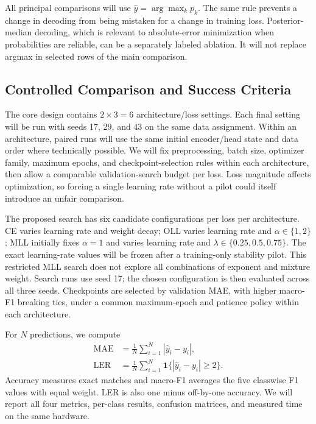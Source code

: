 \documentclass[conference]{IEEEtran}
\newcommand{\MAE}{\operatorname{MAE}}
\newcommand{\LER}{\operatorname{LER}}
\begin{document}


All principal comparisons will use $\hat y=\arg\max_k p_k$. The same rule prevents a change in decoding from being mistaken for a change in training loss. Posterior-median decoding, which is relevant to absolute-error minimization when probabilities are reliable, can be a separately labeled ablation. It will not replace argmax in selected rows of the main comparison.

\subsection{Controlled Comparison and Success Criteria}
The core design contains $2\times3=6$ architecture/loss settings. Each final setting will be run with seeds 17, 29, and 43 on the same data assignment. Within an architecture, paired runs will use the same initial encoder/head state and data order where technically possible. We will fix preprocessing, batch size, optimizer family, maximum epochs, and checkpoint-selection rules within each architecture, then allow a comparable validation-search budget per loss. Loss magnitude affects optimization, so forcing a single learning rate without a pilot could itself introduce an unfair comparison.

The proposed search has six candidate configurations per loss per architecture. CE varies learning rate and weight decay; OLL varies learning rate and $\alpha\in\{1,2\}$; MLL initially fixes $\alpha=1$ and varies learning rate and $\lambda\in\{0.25,0.5,0.75\}$. The exact learning-rate values will be frozen after a training-only stability pilot. This restricted MLL search does not explore all combinations of exponent and mixture weight. Search runs use seed 17; the chosen configuration is then evaluated across all three seeds. Checkpoints are selected by validation MAE, with higher macro-F1 breaking ties, under a common maximum-epoch and patience policy within each architecture.

For $N$ predictions, we compute
\begin{align}
\MAE &=\frac{1}{N}\sum_{i=1}^{N}|\hat y_i-y_i|,\\
\LER &=\frac{1}{N}\sum_{i=1}^{N}\mathbf{1}\{|\hat y_i-y_i|\ge2\}.
\end{align}
Accuracy measures exact matches and macro-F1 averages the five classwise F1 values with equal weight. LER is also one minus off-by-one accuracy. We will report all four metrics, per-class results, confusion matrices, and measured time on the same hardware.
\end{document}

